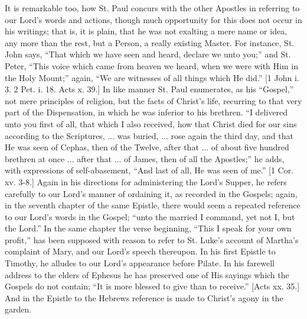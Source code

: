 It is remarkable too, how St. Paul concurs with the other Apostles in
referring to our Lord's words and actions, though much opportunity for
this does not occur in his writings; that is, it is plain, that he was
not exalting a mere name or idea, any more than the rest, but a Person,
a really existing Master. For instance, St. John says, ``That which
we have seen and heard, declare we unto you;'' and St. Peter, ``This voice which came from heaven we heard, when we were with Him in the
Holy Mount;'' again, ``We are witnesses of all things which He
did.'' [1 John i. 3. 2 Pet. i. 18. Acts x. 39.] In like manner St.
Paul enumerates, as his ``Gospel,'' not mere principles of
religion, but the facts of Christ's life, recurring to that very part of
the Dispensation, in which he was inferior to his brethren. ``I
delivered unto you first of all, that which I also received, how that
Christ died for our sins according to the Scriptures, ... was buried,
... rose again the third day, and that He was seen of Cephas, then of
the Twelve, after that ... of about five hundred brethren at once ...
after that ... of James, then of all the Apostles;'' he adds, with
expressions of self-abasement, ``And last of all, He was seen of
me.'' [1 Cor. xv. 3-8.] Again in his directions for administering
the Lord's Supper, he refers carefully to our Lord's manner of ordaining
it, as recorded in the Gospels; again, in the seventh chapter of the
same Epistle, there would seem a repeated reference to our Lord's words
in the Gospel; ``unto the married I command, yet not I, but the
Lord.'' In the same chapter the verse beginning, ``This I speak
for your own profit,'' has been supposed with reason to refer to St.
Luke's account of Martha's complaint of Mary, and our Lord's speech
thereupon. In his first Epistle to Timothy, he alludes to our Lord's
appearance before Pilate. In his farewell address to the elders of
Ephesus he has preserved one of His sayings which the Gospels do not
contain; ``It is more blessed to give than to receive.'' [Acts
xx. 35.] And in the Epistle to the Hebrews reference is made to Christ's
agony in the garden.


